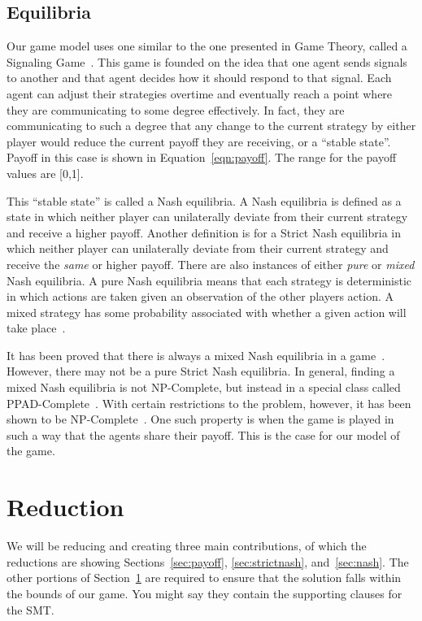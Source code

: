 \documentclass{article}
\begin{document}
\subsection{Equilibria}
Our game model uses one similar to the one presented in Game Theory, called a Signaling Game~\cite{Cho:QuarterlyJournalEconomics:1987,hu2011reinforcement}. This game is founded on the idea that one agent sends signals to another and that agent decides how it should respond to that signal. Each agent can adjust their strategies overtime and eventually reach a point where they are communicating to some degree effectively. In fact, they are communicating to such a degree that any change to the current strategy by either player would reduce the current payoff they are receiving, or a ``stable state''. Payoff in this case is shown in Equation~\ref{eqn:payoff}. The range for the payoff values are [0,1].

This ``stable state'' is called a Nash equilibria. A Nash equilibria is defined as a state in which neither player can unilaterally deviate from their current strategy and receive a higher payoff. Another definition is for a Strict Nash equilibria in which neither player can unilaterally deviate from their current strategy and receive the \textit{same} or higher payoff. There are also instances of either \textit{pure} or \textit{mixed} Nash equilibria. A pure Nash equilibria means that each strategy is deterministic in which actions are taken given an observation of the other players action. A mixed strategy has some probability associated with whether a given action will take place~\cite{10.2307/1969529}.

It has been proved that there is always a mixed Nash equilibria in a game~\cite{10.2307/1969529}. However, there may not be a pure Strict Nash equilibria. In general, finding a mixed Nash equilibria is not NP-Complete, but instead in a special class called PPAD-Complete~\cite{daskalakis2009complexity}. With certain restrictions to the problem, however, it has been shown to be NP-Complete~\cite{gilboa1989nash,sandholm2002complexity}. One such property is when the game is played in such a way that the agents share their payoff. This is the case for our model of the game. 

\section{Reduction}
\label{sec:reductions}
We will be reducing and creating three main contributions, of which the reductions are showing Sections~\ref{sec:payoff}, \ref{sec:strictnash}, and~\ref{sec:nash}. The other portions of Section~\ref{sec:reductions} are required to ensure that the solution falls within the bounds of our game. You might say they contain the supporting clauses for the SMT.
\end{document}
